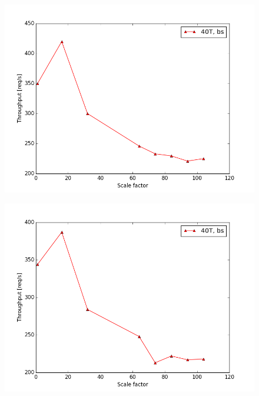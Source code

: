 \begin{figure}[h]
	\begin{minipage}{.5\textwidth}
		\centering
		\includegraphics[scale=0.42]{figures/results/vm115_physical_wbs.png}
		\label{fig:vm115_physical_wbs}
	\end{minipage}
	\begin{minipage}{.5\textwidth}
		\centering
		\includegraphics[scale=0.42]{figures/results/vm116_physical_wbs.png}
		\label{fig:vm116_physical_wbs}
	\end{minipage}
\end{figure}


